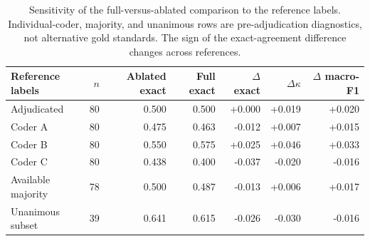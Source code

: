 \begin{table}[t]
\centering
\small
\setlength{\tabcolsep}{6pt}
\begin{tabular}{lrrrrrr}
\toprule
\textbf{Reference labels} & \textbf{$n$} & \textbf{Ablated exact} &
\textbf{Full exact} & \textbf{$\Delta$ exact} &
\textbf{$\Delta\kappa$} & \textbf{$\Delta$ macro-F1} \\
\midrule
Adjudicated & 80 & 0.500 & 0.500 & +0.000 & +0.019 & +0.020 \\
Coder A & 80 & 0.475 & 0.463 & -0.012 & +0.007 & +0.015 \\
Coder B & 80 & 0.550 & 0.575 & +0.025 & +0.046 & +0.033 \\
Coder C & 80 & 0.438 & 0.400 & -0.037 & -0.020 & -0.016 \\
Available majority & 78 & 0.500 & 0.487 & -0.013 & +0.006 & +0.017 \\
Unanimous subset & 39 & 0.641 & 0.615 & -0.026 & -0.030 & -0.016 \\
\bottomrule
\end{tabular}
\caption{Sensitivity of the full-versus-ablated comparison to the reference
labels. Individual-coder, majority, and unanimous rows are pre-adjudication
diagnostics, not alternative gold standards. The sign of the exact-agreement
difference changes across references.}
\label{tab:reference-label-sensitivity}
\end{table}
